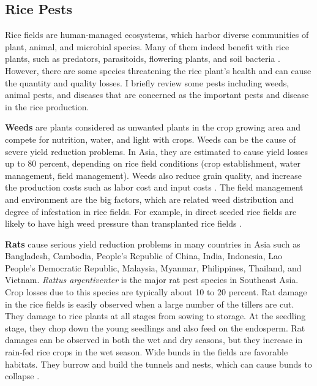 \subsection*{Rice Pests}

Rice fields are human-managed ecosystems, which harbor diverse communities of plant, animal, and microbial species. Many of them indeed benefit with rice plants, such as predators, parasitoids, flowering plants, and soil bacteria \citep{Norton_2010_Rice}. However, there are some species threatening the rice plant's health and can cause the quantity and quality losses. I briefly review some pests including weeds, animal pests, and diseases that are concerned as the important pests and disease in the rice production.


\textbf{Weeds} are plants considered as unwanted plants in the crop growing area and compete for nutrition, water, and light with crops. Weeds can be the cause of severe yield reduction problems. In Asia, they are estimated to cause yield losses up to 80 percent, depending on rice field conditions (crop establishment, water management, field management). Weeds also reduce grain quality, and increase the production costs such as labor cost and input costs \citep{Litsinger_1991_Crop, Savary_2005_Multiple}. The field management and environment are the big factors, which are related weed distribution and degree of infestation in rice fields. For example, in direct seeded rice fields are likely to have high weed pressure than transplanted rice fields \cite{Juraimi_2013_Sustainable}.

\textbf{Rats} cause serious yield reduction problems in many countries in Asia such as Bangladesh, Cambodia, People's Republic of China, India, Indonesia, Lao People's Democratic Republic, Malaysia, Myanmar, Philippines, Thailand, and Vietnam. \textit{Rattus argentiventer} is the major rat pest species in Southeast Asia. Crop losses due to this species are typically about 10 to 20 percent. Rat damage in the rice fields is easily observed when a large number of the tillers are cut. They damage to rice plants at all stages from sowing to storage. At the seedling stage, they chop down the young seedlings and also feed on the endosperm. Rat damages can be observed in both the wet and dry seasons, but they increase in rain-fed rice crops in the wet season. Wide bunds in the fields are favorable habitats. They burrow and build the tunnels and nests, which can cause bunds to collapse \citep{Singleton_2003_Impacts}.

